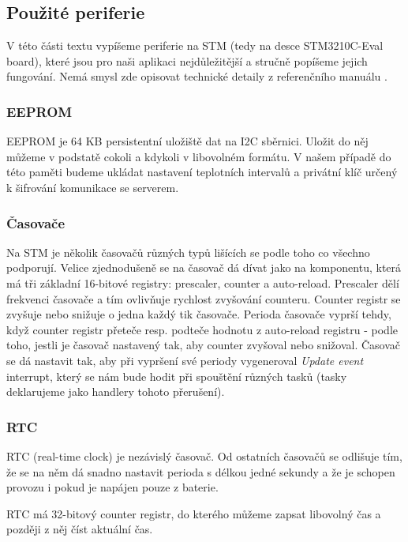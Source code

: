 
\subsection{Použité periferie}
V této části textu vypíšeme periferie na STM (tedy na desce STM3210C-Eval board), které jsou
pro naši aplikaci nejdůležitější a stručně popíšeme jejich fungování.
Nemá smysl zde opisovat technické detaily z referenčního manuálu \cite{ReferenceManual}.

\subsubsection{EEPROM}
EEPROM je 64 KB persistentní uložiště dat na I2C sběrnici.
Uložit do něj můžeme v podstatě cokoli a kdykoli v libovolném formátu.
V našem případě do této paměti budeme ukládat nastavení teplotních intervalů a privátní klíč
určený k šifrování komunikace se serverem.

\subsubsection{Časovače}
Na STM je několik časovačů různých typů lišících se podle toho co všechno podporují.
Velice zjednodušeně se na časovač dá dívat jako na komponentu, která má tři základní
16-bitové registry: prescaler, counter a auto-reload.
Prescaler dělí frekvenci časovače a tím ovlivňuje rychlost zvyšování counteru.
Counter registr se zvyšuje nebo snižuje o jedna každý tik časovače.
Perioda časovače vyprší tehdy, když counter registr přeteče resp. podteče hodnotu
z auto-reload registru - podle toho, jestli je časovač nastavený tak, aby counter zvyšoval nebo snižoval.
Časovač se dá nastavit tak, aby při vypršení své periody vygeneroval \emph{Update event} interrupt,
který se nám bude hodit při spouštění různých tasků (tasky deklarujeme jako handlery tohoto přerušení).

\subsubsection{RTC}
RTC (real-time clock) je nezávislý časovač.
Od ostatních časovačů se odlišuje tím, že se na něm dá snadno nastavit perioda
s délkou jedné sekundy a že je schopen provozu i pokud je napájen pouze z
baterie.

RTC má 32-bitový counter registr, do kterého můžeme zapsat libovolný čas a později z
něj číst aktuální čas.

